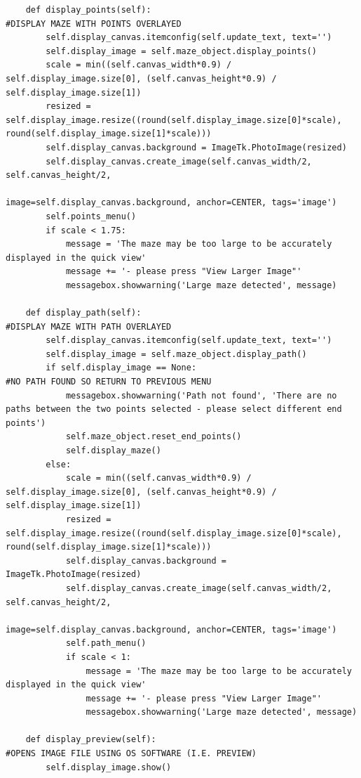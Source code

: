 \documentclass[titlepage]{article}
\begin{document}
\begin{changemargin}{-1in}{-1in}
\begin{verbatim}
    def display_points(self):                                                   #DISPLAY MAZE WITH POINTS OVERLAYED
        self.display_canvas.itemconfig(self.update_text, text='')
        self.display_image = self.maze_object.display_points()
        scale = min((self.canvas_width*0.9) / self.display_image.size[0], (self.canvas_height*0.9) / self.display_image.size[1])
        resized = self.display_image.resize((round(self.display_image.size[0]*scale), round(self.display_image.size[1]*scale)))
        self.display_canvas.background = ImageTk.PhotoImage(resized)
        self.display_canvas.create_image(self.canvas_width/2, self.canvas_height/2,
                                         image=self.display_canvas.background, anchor=CENTER, tags='image')
        self.points_menu()
        if scale < 1.75:
            message = 'The maze may be too large to be accurately displayed in the quick view'
            message += '- please press "View Larger Image"'
            messagebox.showwarning('Large maze detected', message)

    def display_path(self):                                                     #DISPLAY MAZE WITH PATH OVERLAYED
        self.display_canvas.itemconfig(self.update_text, text='')
        self.display_image = self.maze_object.display_path()
        if self.display_image == None:                                          #NO PATH FOUND SO RETURN TO PREVIOUS MENU
            messagebox.showwarning('Path not found', 'There are no paths between the two points selected - please select different end points')
            self.maze_object.reset_end_points()
            self.display_maze()
        else:
            scale = min((self.canvas_width*0.9) / self.display_image.size[0], (self.canvas_height*0.9) / self.display_image.size[1])
            resized = self.display_image.resize((round(self.display_image.size[0]*scale), round(self.display_image.size[1]*scale)))
            self.display_canvas.background = ImageTk.PhotoImage(resized)
            self.display_canvas.create_image(self.canvas_width/2, self.canvas_height/2,
                                             image=self.display_canvas.background, anchor=CENTER, tags='image')
            self.path_menu()
            if scale < 1:
                message = 'The maze may be too large to be accurately displayed in the quick view'
                message += '- please press "View Larger Image"'
                messagebox.showwarning('Large maze detected', message)

    def display_preview(self):                                                  #OPENS IMAGE FILE USING OS SOFTWARE (I.E. PREVIEW)
        self.display_image.show()


\end{verbatim}
\end{changemargin}
\end{document}
